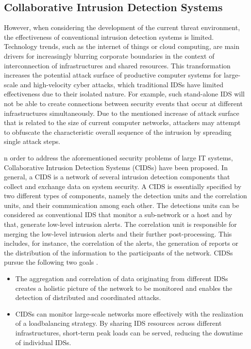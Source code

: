 \subsection{Collaborative Intrusion Detection Systems}

However, when considering the development of the current threat environment, the effectiveness of conventional intrusion detection systems is limited. Technology trends, such as the internet of things or cloud computing, are main drivers for increasingly blurring corporate boundaries in the context of interconnection of infrastructures and shared resources. This transformation increases the potential attack surface of productive computer systems for large-scale and high-velocity cyber attacks, which traditional IDSs have limited effectiveness due to their isolated nature. For example, such stand-alone IDS will not be able to create connections between security events that occur at different infrastructures simultaneously. Due to the mentioned increase of attack surface that is related to the size of current computer networks, attackers may attempt to obfuscate the characteristic overall sequence of the intrusion by spreading single attack steps.

n order to address the aforementioned security problems of large IT systems, Collaborative Intrusion Detection Systems (CIDSs) have been proposed. In general, a CIDS is a network of several intrusion detection components that collect and exchange data on system security. A CIDS is essentially specified by two different types of components, namely the detection units and the correlation units, and their communication among each other. The detections units can be considered as conventional IDS that monitor a sub-network or a host and by that, generate low-level intrusion alerts. The correlation unit is responsible for merging the low-level intrusion alerts and their further post-processing. This includes, for instance, the correlation of the alerts, the generation of reports or the distribution of the information to the participants of the network. CIDSs pursue the following two goals \cite[24]{vasilomanolakis_collaborative_2016}.

\begin{itemize}
    \item The aggregation and correlation of data originating from different IDSs creates a holistic picture of the network to be monitored and enables the detection of distributed and coordinated attacks.
    \item CIDSs can monitor large-scale networks more effectively with the realization of a loadbalancing strategy. By sharing IDS resources across different infrastructures, short-term peak loads can be served, reducing the downtime of individual IDSs.
\end{itemize}